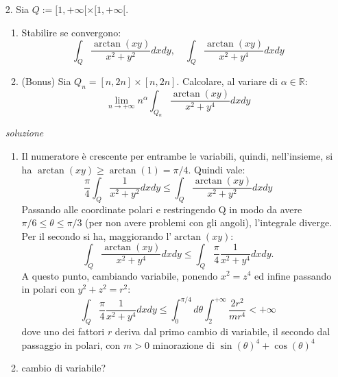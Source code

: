 \documentclass[a4paper]{article}
\begin{document}
\begin{itemize}
È VERAMENTE NECESSARIO FARE IL GRDIENTE?
Controlliamo se si annulla il gradiente di $f$ in $S$.
\begin{equation}
\grad f = \begin{pmatrix}
1 \\ 1 \\ -2z
\end{pmatrix} \neq \begin{pmatrix}
0 \\ 0\\ 0
\end{pmatrix} \quad \quad \forall (x,y,z) \in \mathbb{R}^3
\end{equation}



\item[2.] Sia $Q := [1,+\infty[\times [1,+\infty[$.
\begin{enumerate}[label=(\alph*)]
\item Stabilire se convergono:
\begin{equation*}
\int_{Q}\frac{\arctan(xy)}{x^{2}+y^{2}}dxdy,\quad \int_{Q}\frac{\arctan(xy)}{x^{2}+y^{4}}dxdy
\end{equation*}
\item (Bonus) Sia $Q_{n} = [n,2n]\times [n,2n]$. Calcolare, al variare di $\alpha \in \mathbb{R}$:
\begin{equation*}
\lim_{n\to +\infty}n^{\alpha}\int_{Q_{n}}\frac{\arctan(xy)}{x^{2}+y^{4}}dxdy
\end{equation*}
\end{enumerate}
\emph{soluzione}\\
\begin{enumerate}[label=(\alph*)]
\item Il numeratore è crescente per entrambe le variabili, quindi, nell'insieme, si ha $\arctan(xy) \geq \arctan(1) = \pi/4$.
Quindi vale:
\begin{equation}
\frac{\pi}{4}\int_{Q}\frac{1}{x^{2}+y^{2}}dxdy\leq\int_{Q}\frac{\arctan(xy)}{x^{2}+y^{2}}dxdy
\end{equation}
Passando alle coordinate polari e restringendo Q in modo da avere $\pi/6\leq\theta\leq\pi/3$ (per non avere problemi con gli angoli), l'integrale diverge.\\
Per il secondo si ha, maggiorando l'$\arctan(xy)$:
\begin{equation}
\int_{Q}\frac{\arctan(xy)}{x^{2}+y^{4}}dxdy \leq \int_{Q}\frac{\pi}{4}\frac{1}{x^{2}+y^{4}}dxdy.
\end{equation}
A questo punto, cambiando variabile, ponendo $x^{2}=z^{4}$ ed infine passando in polari con $y^{2}+z^{2}=r^{2}$:
\begin{equation}
\int_{Q}\frac{\pi}{4}\frac{1}{x^{2}+y^{4}}dxdy\leq\int_{0}^{\pi/4}d\theta\int_{2}^{+\infty}\frac{2r^{2}}{mr^{4}} < +\infty
\end{equation}
dove uno dei fattori $r$ deriva dal primo cambio di variabile, il secondo dal passaggio in polari, con $m>0$ minorazione di $\sin(\theta)^{4}+\cos(\theta)^{4}$
\item cambio di variabile?
\end{enumerate}



\end{itemize}
\end{document}

